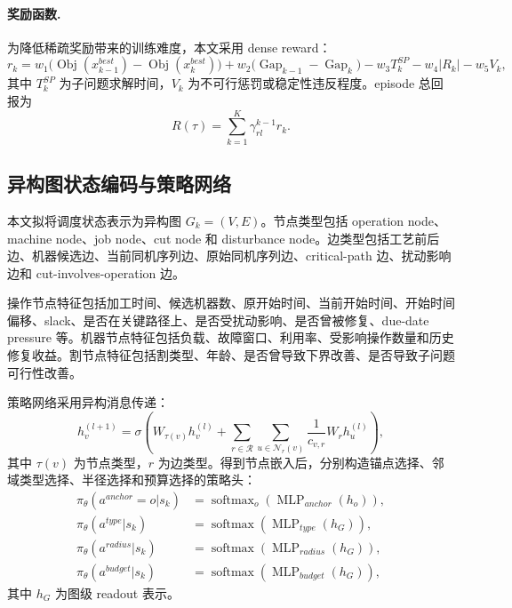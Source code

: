 \documentclass[UTF8,12pt,a4paper]{ctexart}
\newcommand{\obj}{\operatorname{Obj}}
\newcommand{\gap}{\operatorname{Gap}}
\begin{document}
\paragraph{奖励函数.} 为降低稀疏奖励带来的训练难度，本文采用 dense reward：
\begin{equation}
\label{eq:reward}
    r_k = w_1\big(\obj(x^{best}_{k-1})-\obj(x^{best}_k)\big)
    +w_2\big(\gap_{k-1}-\gap_k\big)
    -w_3 T^{SP}_k
    -w_4 |R_k|
    -w_5 V_k,
\end{equation}
其中 $T^{SP}_k$ 为子问题求解时间，$V_k$ 为不可行惩罚或稳定性违反程度。episode 总回报为
\begin{equation}
    R(\tau)=\sum_{k=1}^{K}\gamma_{rl}^{k-1}r_k.
\end{equation}

\subsection{异构图状态编码与策略网络}

本文拟将调度状态表示为异构图 $G_k=(V,E)$。节点类型包括 operation node、machine node、job node、cut node 和 disturbance node。边类型包括工艺前后边、机器候选边、当前同机序列边、原始同机序列边、critical-path 边、扰动影响边和 cut-involves-operation 边。

操作节点特征包括加工时间、候选机器数、原开始时间、当前开始时间、开始时间偏移、slack、是否在关键路径上、是否受扰动影响、是否曾被修复、due-date pressure 等。机器节点特征包括负载、故障窗口、利用率、受影响操作数量和历史修复收益。割节点特征包括割类型、年龄、是否曾导致下界改善、是否导致子问题可行性改善。

策略网络采用异构消息传递：
\begin{equation}
    h_v^{(l+1)}=\sigma\left(W_{\tau(v)}h_v^{(l)}+
    \sum_{r\in\mathcal{R}}\sum_{u\in\mathcal{N}_r(v)}\frac{1}{c_{v,r}}W_rh_u^{(l)}\right),
\end{equation}
其中 $\tau(v)$ 为节点类型，$r$ 为边类型。得到节点嵌入后，分别构造锚点选择、邻域类型选择、半径选择和预算选择的策略头：
\begin{align}
    \pi_\theta(a^{anchor}=o|s_k)&=\operatorname{softmax}_o(\operatorname{MLP}_{anchor}(h_o)),\\
    \pi_\theta(a^{type}|s_k)&=\operatorname{softmax}(\operatorname{MLP}_{type}(h_G)),\\
    \pi_\theta(a^{radius}|s_k)&=\operatorname{softmax}(\operatorname{MLP}_{radius}(h_G)),\\
    \pi_\theta(a^{budget}|s_k)&=\operatorname{softmax}(\operatorname{MLP}_{budget}(h_G)),
\end{align}
其中 $h_G$ 为图级 readout 表示。
\end{document}
